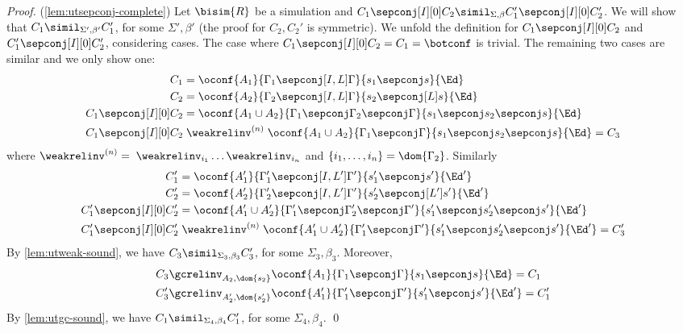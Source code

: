 \begin{proof}(\cref{lem:utsepconj-complete})
  Let $\bisim{R}$ be a simulation and
  $C_1 \sepconj[I][0] C_2 \simil_{\Sigma,\beta} C_1' \sepconj[I][0] C_2'$.
  We will show that $C_1 \simil_{\Sigma',\beta'} C_1'$, for some $\Sigma',\beta'$ (the proof for $C_2,C_2'$ is symmetric).
  We unfold the definition for
  $C_1 \sepconj[I][0] C_2$ and
  $C_1' \sepconj[I][0] C_2'$, considering cases.
  The case where $C_1 \sepconj[I][0] C_2 = C_1=\botconf$ is trivial.
  The remaining two cases are similar and we only show one:
  \begin{align*}
    C_1&=\oconf{A_1}{\Gamma_1\sepconj[I,L]\Gamma}{s_1\sepconj s}{\Ed}
    \\
    C_2&=\oconf{A_2}{\Gamma_2\sepconj[I,L]\Gamma}{s_2\sepconj[L] s}{\Ed}
    \\
    C_1 \sepconj[I][0] C_2 &= 
    \oconf{A_1\cup A_2}{\Gamma_1\sepconj\Gamma_2\sepconj\Gamma}{s_1\sepconj s_2\sepconj s}{\Ed}
    \\
    C_1 \sepconj[I][0] C_2 &\mathrel{{\weakrelinv}^{(n)}}
    \oconf{A_1\cup A_2}{\Gamma_1\sepconj\Gamma}{s_1\sepconj s_2\sepconj s}{\Ed} = C_3
  \end{align*}
  where ${\weakrelinv}^{(n)} =\; \weakrelinv_{i_1}\ldots\weakrelinv_{i_n}$ and $\{i_1,\ldots,i_n\}=\dom{\Gamma_2}$.
  Similarly
  \begin{align*}
    C_1'&=\oconf{A_1'}{\Gamma_1'\sepconj[I,L']\Gamma'}{s_1'\sepconj s'}{\Ed'}
    \\
    C_2'&=\oconf{A_2'}{\Gamma_2'\sepconj[I,L']\Gamma'}{s_2'\sepconj[L'] s'}{\Ed'}
    \\
    C_1' \sepconj[I][0] C_2' &= 
    \oconf{A_1'\cup A_2'}{\Gamma_1'\sepconj\Gamma_2'\sepconj\Gamma'}{s_1'\sepconj s_2'\sepconj s'}{\Ed'}
    \\
    C_1' \sepconj[I][0] C_2' &\mathrel{{\weakrelinv}^{(n)}}
    \oconf{A_1'\cup A_2'}{\Gamma_1'\sepconj\Gamma'}{s_1'\sepconj s_2'\sepconj s'}{\Ed'} = C_3'
  \end{align*}
  By \cref{lem:utweak-sound}, we have
  $C_3 \simil_{\Sigma_3,\beta_3} C_3'$, for some $\Sigma_3,\beta_3$. Moreover,
  \begin{align*}
    C_3 & \gcrelinv_{A_2,\dom{s_2}} \oconf{A_1}{\Gamma_1\sepconj\Gamma}{s_1\sepconj s}{\Ed} = C_1
    \\
    C_3' & \gcrelinv_{A_2',\dom{s_2'}} \oconf{A_1'}{\Gamma_1'\sepconj\Gamma'}{s_1'\sepconj s'}{\Ed'} = C_1'
  \end{align*}
  By \cref{lem:utgc-sound}, we have
  $C_1 \simil_{\Sigma_4,\beta_4} C_1'$, for some $\Sigma_4,\beta_4$.
\qed\end{proof}


